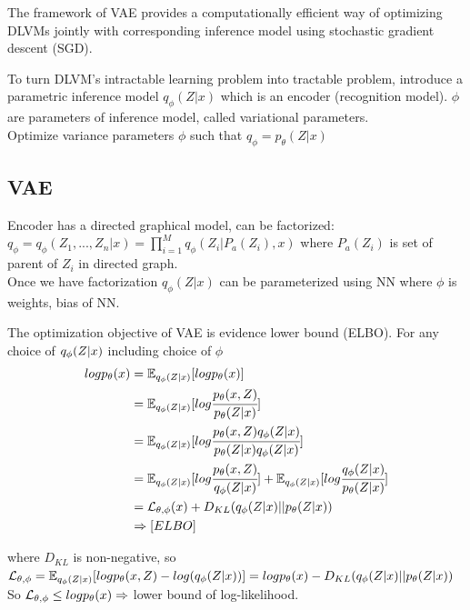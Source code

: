 \documentclass[12pt,a4paper]{article}
\begin{document}
The framework of VAE provides a computationally efficient way of optimizing DLVMs jointly with corresponding inference model using stochastic gradient descent (SGD). 

To turn DLVM's intractable learning problem into tractable problem, introduce a parametric inference model $q_\phi(Z|x)$ which is an encoder (recognition model). $\phi$ are parameters of inference model, called variational parameters. \\
Optimize variance parameters $\phi$ such that $q_\phi=p_\theta(Z|x)$


\subsection{VAE}
Encoder has a directed graphical model, can be factorized:\\
$q_\phi=q_\phi(Z_1, ..., Z_n|x)=\prod^M_{i=1} q_\phi(Z_i|P_a(Z_i),x)$ where $P_a(Z_i)$ is set of parent of $Z_i$ in directed graph. \\
Once we have factorization $q_\phi(Z|x)$ can be parameterized using NN where $\phi$ is weights, bias of NN. 

\vspace{0.5cm}
The optimization objective of VAE is evidence lower bound (ELBO). For any choice of $q_\phi(Z|x)$ including choice of $\phi$\\

\begin{equation}
    \begin{split}
log p_\theta (x) &= \mathbb{E}_{q_\phi(Z|x)}[logp_\theta(x)] \\
&=\mathbb{E}_{q_\phi(Z|x)}[log\cfrac{p_\theta(x,Z)}{p_\theta(Z|x)}]\\
&=\mathbb{E}_{q_\phi(Z|x)}[log \cfrac{p_\theta(x,Z)q_\phi(Z|x)}{p_\theta(Z|x)q_\phi(Z|x)}] \\
&=\mathbb{E}_{q_\phi(Z|x)}[log\cfrac{p_\theta(x,Z)}{q_\phi(Z|x)}]+\mathbb{E}_{q_\phi(Z|x)}[log\cfrac{q_\phi(Z|x)}{p_\theta(Z|x)}]\\
&=\mathcal{L}_{\theta,\phi}(x)+D_{KL}(q_\phi(Z|x)||p_\theta(Z|x))\\
&\Rightarrow [ELBO]\\
\end{split}
\end{equation}

where $D_{KL}$ is non-negative, so $\mathcal{L}_{\theta,\phi}=\mathbb{E}_{q_\phi(Z|x)}[log p_\theta(x,Z)-log(q_\phi(Z|x))]\\
=logp_\theta(x)-D_{KL}(q_\phi(Z|x)||p_\theta(Z|x))$\\
So $\mathcal{L}_{\theta,\phi}\le log p_\theta(x)\Rightarrow$ lower bound of log-likelihood.
\end{document}
